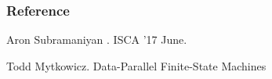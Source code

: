 \documentclass{beamer}
\begin{document}
  \begin{frame}[allowframebreaks]
    \frametitle<presentation>{Reference}
      
    \begin{thebibliography}{10}
      

    Aron Subramaniyan
      .
      \newblock ISCA '17 June.
  
      

      Todd Mytkowicz.
      \newblock Data-Parallel Finite-State Machines
    \end{thebibliography}
  \end{frame}
\end{document}
